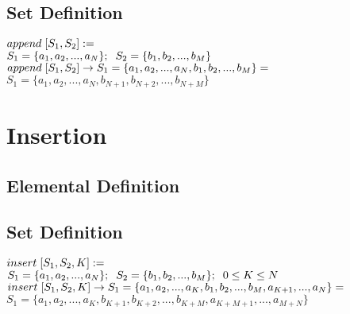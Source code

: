 \documentclass[11pt]{article}
\begin{document}
\subsection{Set Definition}
\begin{center}
$append \hspace{1mm} \lbrack S_1,S_2 \rbrack :=$
\\ \vspace{2mm}
$S_1 = \{a_1,a_2,...,a_N\}; \hspace{2mm} S_2 = \{b_1,b_2,...,b_M\}$
\\ \vspace{2mm}
$append \hspace{1mm} \lbrack S_1,S_2 \rbrack \rightarrow S_1  =  \{a_1,a_2,...,a_N, b_1,b_2,...,b_M\} =$
\\ \vspace{2mm}
$S_1  =  \{a_1,a_2,...,a_N, b_{N+1},b_{N+2},...,b_{N+M}\}$
\end{center}





\section{Insertion}

\subsection{Elemental Definition}

\subsection{Set Definition}
\begin{center}
$insert \hspace{1mm} \lbrack S_1,S_2,K \rbrack :=$
\\ \vspace{2mm}
$S_1 = \{a_1,a_2,...,a_N\}; \hspace{2mm} S_2 = \{b_1,b_2,...,b_M\}; \hspace{2mm} 0 \leq K \leq N$
\\ \vspace{2mm}
$insert \hspace{1mm} \lbrack S_1,S_2,K \rbrack \rightarrow S_1 = \{a_1,a_2,...,a_K,b_1,b_2,...,b_M,a_{K+1},...,a_N\} = $
\\ \vspace{2mm} 
$S_1 = \{a_1,a_2,...,a_K,b_{K+1},b_{K+2},...,b_{K+M},a_{K+M+1},...,a_{M + N}\}$
\end{center}
\end{document}
